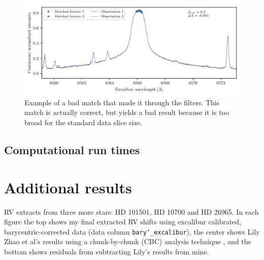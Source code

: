 

\begin{figure}%
    \begin{wide}  
    \includegraphics[scale=0.72]{figures/bad_match_example.pdf}
    \caption{Example of a bad match that made it through the filters. This match is actually correct, but yields a bad result because it is too broad for the standard data slice size.}
    \label{fig:bad_match_example}
\end{wide}
\end{figure}

\subsection*{Computational run times}



% 
% 
\newpage
\section{Additional results}\label{appendix:results}

\small{RV extracts from three more stars: HD 101501, HD 10700 and HD 26965. In each figure the top shows my final extracted RV shifts using excalibur calibrated, barycentric-corrected data (data column \texttt{bary\char`_excalibur}), the center shows Lily Zhao et al's results using a chunk-by-chunk (CBC) analysis technique \cite{yale_data}, and the bottom shows residuals from subtracting Lily's results from mine. }

